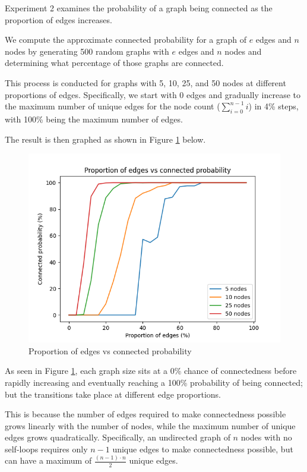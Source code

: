 \documentclass{article}
\begin{document}
Experiment 2 examines the probability of a graph being connected as the proportion of edges increases.

We compute the approximate connected probability for a graph of $e$ edges and $n$ nodes by generating 500 random graphs with $e$ edges and $n$ nodes and determining what percentage of those graphs are connected.

This process is conducted for graphs with 5, 10, 25, and 50 nodes at different proportions of edges. Specifically, we start with 0 edges and gradually increase to the maximum number of unique edges for the node count ($\sum_{i=0}^{n-1}i$) in 4\% steps, with 100\% being the maximum number of edges.

The result is then graphed as shown in Figure \ref{fig:edges_vs_connected} below.

\begin{figure}[H]
    \centering
    \includegraphics[width=0.8\linewidth]{experiment_2.png}
    \caption{Proportion of edges vs connected probability}
    \label{fig:edges_vs_connected}
\end{figure}

As seen in Figure \ref{fig:edges_vs_connected}, each graph size sits at a 0\% chance of connectedness before rapidly increasing and eventually reaching a 100\% probability of being connected; but the transitions take place at different edge proportions.

This is because the number of edges required to make connectedness possible grows linearly with the number of nodes, while the maximum number of unique edges grows quadratically. Specifically, an undirected graph of $n$ nodes with no self-loops requires only $n - 1$ unique edges to make connectedness possible, but can have a maximum of $\frac{(n - 1) \cdot n}{2}$ unique edges.
\end{document}
